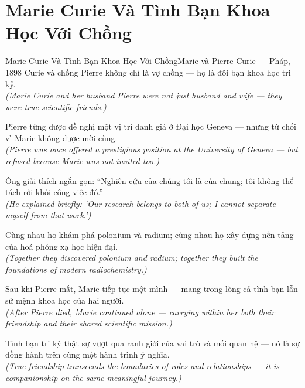\section{Marie Curie Và Tình Bạn Khoa Học Với Chồng}
\begin{truyen}{Marie Curie Và Tình Bạn Khoa Học Với Chồng}{Marie và Pierre Curie --- Pháp, 1898}
 Curie và chồng Pierre không chỉ là vợ chồng --- họ là đôi bạn khoa học tri kỷ.\\[4pt]
\textit{(Marie Curie and her husband Pierre were not just husband and wife --- they were true scientific friends.)}

Pierre từng được đề nghị một vị trí danh giá ở Đại học Geneva --- nhưng từ chối vì Marie không được mời cùng.\\[4pt]
\textit{(Pierre was once offered a prestigious position at the University of Geneva --- but refused because Marie was not invited too.)}

Ông giải thích ngắn gọn: ``Nghiên cứu của chúng tôi là của chung; tôi không thể tách rời khỏi công việc đó.''\\[4pt]
\textit{(He explained briefly: `Our research belongs to both of us; I cannot separate myself from that work.')}

Cùng nhau họ khám phá polonium và radium; cùng nhau họ xây dựng nền tảng của hoá phóng xạ học hiện đại.\\[4pt]
\textit{(Together they discovered polonium and radium; together they built the foundations of modern radiochemistry.)}

Sau khi Pierre mất, Marie tiếp tục một mình --- mang trong lòng cả tình bạn lẫn sứ mệnh khoa học của hai người.\\[4pt]
\textit{(After Pierre died, Marie continued alone --- carrying within her both their friendship and their shared scientific mission.)}

\end{truyen}
\begin{baihoc}
  Tình bạn tri kỷ thật sự vượt qua ranh giới của vai trò và mối quan hệ --- nó là sự đồng hành trên cùng một hành trình ý nghĩa.\\[4pt]
  \textit{(True friendship transcends the boundaries of roles and relationships --- it is companionship on the same meaningful journey.)}
\end{baihoc}

